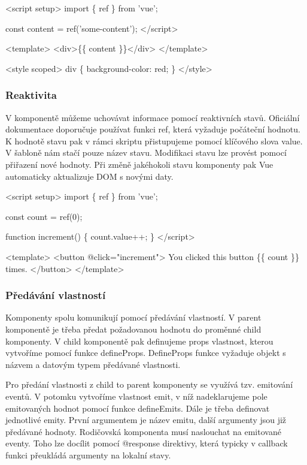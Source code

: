 \begin{prog}
<script setup>
  import \{ ref \} from 'vue';
  
  const content = ref('some-content');
</script>
  
<template>
  <div>\{\{ content \}\}</div>
</template>
  
<style scoped>
  div \{
    background-color: red;
  \}
</style>
\end{prog}

\subsubsection{Reaktivita}

V komponentě můžeme uchovávat informace pomocí reaktivních stavů. Oficiální dokumentace doporučuje používat funkci ref, která vyžaduje počáteční hodnotu. 
K hodnotě stavu pak v rámci skriptu přistupujeme pomocí klíčového slova value. V šabloně nám stačí pouze název stavu. 
Modifikaci stavu lze provést pomocí přiřazení nové hodnoty. Při změně jakéhokoli stavu komponenty pak Vue automaticky aktualizuje DOM s novými daty.\cite{vue}

\begin{prog}
<script setup>
  import \{ ref \} from 'vue';
  
  const count = ref(0);

  function increment() \{
    count.value++;
  \}
</script>
  
<template>
  <button @click="increment">
    You clicked this button \{\{ count \}\} times.
  </button>
</template>
\end{prog}

\subsubsection{Předávání vlastností}

Komponenty spolu komunikují pomocí předávání vlastností. V parent komponentě je třeba předat požadovanou hodnotu do proměnné child komponenty. 
V child komponentě pak definujeme props vlastnost, kterou vytvoříme pomocí funkce defineProps. 
DefineProps funkce vyžaduje objekt s názvem a datovým typem předávané vlastnosti.

Pro předání vlastnosti z child to parent komponenty se využívá tzv. emitování eventů. 
V potomku vytvoříme vlastnost emit, v níž nadeklarujeme pole emitovaných hodnot pomocí funkce defineEmits. Dále je třeba definovat jednotlivé emity. 
První argumentem je název emitu, další argumenty jsou již předávané hodnoty. Rodičovská komponenta musí naslouchat na emitované eventy. 
Toho lze docílit pomocí @response direktivy, která typicky v callback funkci přeukládá argumenty na lokalní stavy.\cite{vuemacrae,vue}

